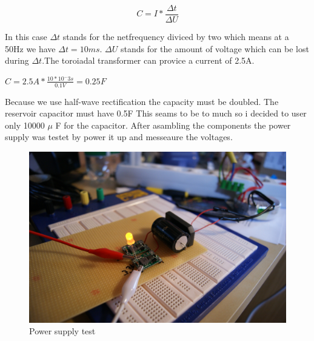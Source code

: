 \begin{equation}
	C=I*\frac{\Delta t}{\Delta U}
	\label{reservoidCapacitor}
\end{equation} 

In this case $\Delta t$ stands for the netfrequency diviced by two which means at a 50Hz we have $\Delta t = 10ms$. $\Delta U$ stands for the amount of voltage which can be lost during $\Delta t$.The toroiadal transformer can provice a current of 2.5A. 
\begin{center}
	$C=2.5A * \frac{10*10^-3s}{0.1V}=0.25F$
\end{center}
Because we use half-wave rectification the capacity must be doubled. The reservoir capacitor must have 0.5F
This seams to be to much so i decided to user only 10000 $\mu$ F for the capacitor. After asambling the components the power supply was testet by power it up and messeaure the voltages.

\begin{figure}[h!]
	\begin{center}
	\includegraphics[scale=0.4]{pictures/powerSupplyTest}
	\caption{Power supply test}	
	\end{center}
\end{figure}

